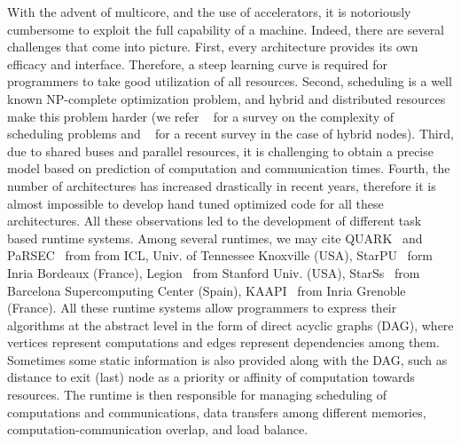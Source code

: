\documentclass[sigconf]{acmart}
\begin{document}
	With the advent of multicore, and the use of accelerators, it is notoriously cumbersome to exploit the full capability of a machine. Indeed, there are several challenges that come into picture. First, every architecture provides its own efficacy and interface. Therefore, a steep learning curve is required for programmers to take good utilization of all resources. Second, scheduling is a well known NP-complete optimization problem, and hybrid and distributed resources make this problem harder (we refer ~\cite{webpagescheduling} for a survey on the complexity of scheduling problems and ~\cite{bleuse2015scheduling} for a recent survey in the case of hybrid nodes). Third, due to shared buses and parallel resources, it is challenging to obtain a precise model based on prediction of computation and communication times. Fourth, the number of architectures has increased drastically in recent years, therefore it is almost impossible to develop hand tuned optimized code for all these architectures. All these observations led to the development of different task based runtime systems. Among several runtimes, we may cite QUARK~\cite{YarKhan:2011:Quark:Manual} and PaRSEC~\cite{parsec} from from ICL, Univ. of Tennessee Knoxville (USA), StarPU~\cite{starpu} form Inria Bordeaux (France), Legion~\cite{legion12} from Stanford Univ. (USA), StarSs~\cite{ompss} from Barcelona Supercomputing Center (Spain), KAAPI~\cite{kaapi} from Inria Grenoble (France). All these runtime systems allow programmers to express their algorithms at the abstract level in the form of direct acyclic graphs (DAG), where vertices represent computations and edges represent dependencies among them. Sometimes some static information is also provided along with the DAG, such as distance to exit (last) node as a priority or affinity of computation towards resources. The runtime is then responsible for managing scheduling of computations and communications, data transfers among different memories, computation-communication overlap, and load balance.
	
	
	
\end{document}
